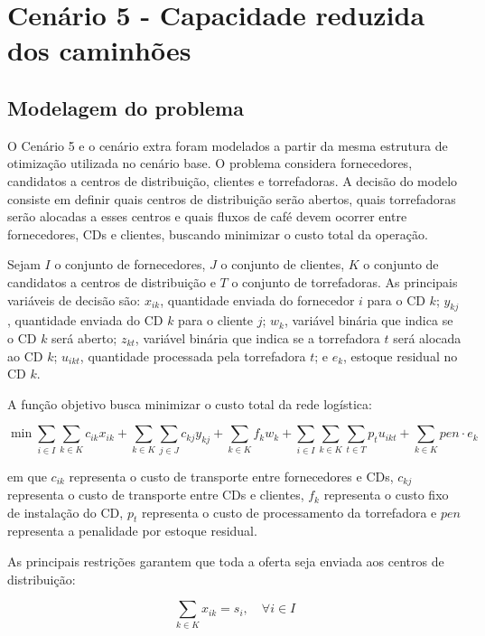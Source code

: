 \documentclass[a4paper,11pt]{article}
\begin{document}
\section{Cenário 5 - Capacidade reduzida dos caminhões}

\subsection{Modelagem do problema}

O Cenário 5 e o cenário extra foram modelados a partir da mesma estrutura de otimização utilizada no cenário base. O problema considera fornecedores, candidatos a centros de distribuição, clientes e torrefadoras. A decisão do modelo consiste em definir quais centros de distribuição serão abertos, quais torrefadoras serão alocadas a esses centros e quais fluxos de café devem ocorrer entre fornecedores, CDs e clientes, buscando minimizar o custo total da operação.

Sejam $I$ o conjunto de fornecedores, $J$ o conjunto de clientes, $K$ o conjunto de candidatos a centros de distribuição e $T$ o conjunto de torrefadoras. As principais variáveis de decisão são: $x_{ik}$, quantidade enviada do fornecedor $i$ para o CD $k$; $y_{kj}$, quantidade enviada do CD $k$ para o cliente $j$; $w_k$, variável binária que indica se o CD $k$ será aberto; $z_{kt}$, variável binária que indica se a torrefadora $t$ será alocada ao CD $k$; $u_{ikt}$, quantidade processada pela torrefadora $t$; e $e_k$, estoque residual no CD $k$.

A função objetivo busca minimizar o custo total da rede logística:

\begin{equation*}
\min
\sum_{i \in I}\sum_{k \in K} c_{ik}x_{ik}
+
\sum_{k \in K}\sum_{j \in J} c_{kj}y_{kj}
+
\sum_{k \in K} f_kw_k
+
\sum_{i \in I}\sum_{k \in K}\sum_{t \in T} p_tu_{ikt}
+
\sum_{k \in K} pen \cdot e_k
\end{equation*}

em que $c_{ik}$ representa o custo de transporte entre fornecedores e CDs, $c_{kj}$ representa o custo de transporte entre CDs e clientes, $f_k$ representa o custo fixo de instalação do CD, $p_t$ representa o custo de processamento da torrefadora e $pen$ representa a penalidade por estoque residual.

As principais restrições garantem que toda a oferta seja enviada aos centros de distribuição:

\begin{equation*}
\sum_{k \in K} x_{ik} = s_i, \quad \forall i \in I
\end{equation*}
\end{document}
